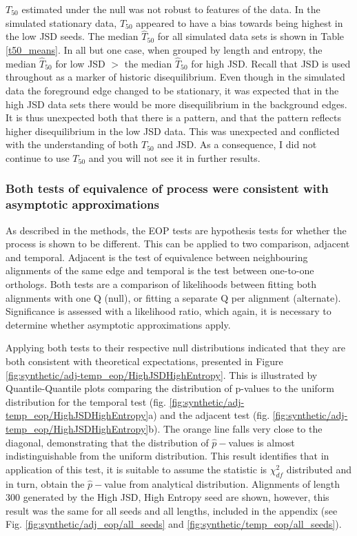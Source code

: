 

$T_{50}$ estimated under the null was not robust to features of the data. In the simulated stationary data, $T_{50}$ appeared to have a bias towards being highest in the low JSD seeds. The median $\hat T_{50}$ for all simulated data sets is shown in Table \ref{t50_means}. In all but one case, when grouped by length and entropy, the median $\hat T_{50}$ for low JSD $>$ the median $\hat T_{50}$ for high JSD. Recall that JSD is used throughout as a marker of historic disequilibrium. Even though in the simulated data the foreground edge changed to be stationary, it was expected that in the high JSD data sets there would be more disequilibrium in the background edges. It is thus unexpected both that there is a pattern, and that the pattern reflects higher disequilibrium in the low JSD data. This was unexpected and conflicted with the understanding of both $T_{50}$ and JSD.  As a consequence, I did not continue to use $T_{50}$ and you will not see it in further results.



\subsubsection*{Both tests of equivalence of process were consistent with asymptotic approximations}

 As described in the methods, the EOP tests are hypothesis tests for whether the process is shown to be different. This can be applied to two comparison, adjacent and temporal. Adjacent is the test of equivalence between neighbouring alignments of the same edge and temporal is the test between one-to-one orthologs. Both tests are a comparison of likelihoods between fitting both alignments with one $\mathrm{Q}$ (null), or fitting a separate $\mathrm{Q}$ per alignment (alternate). Significance is assessed with a likelihood ratio, which again, it is necessary to determine whether asymptotic approximations apply. 

Applying both tests to their respective null distributions indicated that they are both consistent with theoretical expectations, presented in Figure \ref{fig:synthetic/adj-temp_eop/HighJSDHighEntropy}. This is illustrated by Quantile-Quantile plots comparing the distribution of p-values to the uniform distribution for the temporal test (fig. \ref{fig:synthetic/adj-temp_eop/HighJSDHighEntropy}a) and the adjacent test (fig. \ref{fig:synthetic/adj-temp_eop/HighJSDHighEntropy}b). The orange line falls very close to the diagonal, demonstrating that the distribution of $\hat p-$values is almost indistinguishable from the uniform distribution.  This result identifies that in application of this test, it is suitable to assume the statistic is $\chi^2_{df}$ distributed and in turn, obtain the $\hat p-$value from analytical distribution. Alignments of length 300 generated by the High JSD, High Entropy seed are shown, however, this result was the same for all seeds and all lengths, included in the appendix (see Fig. \ref{fig:synthetic/adj_eop/all_seeds} and \ref{fig:synthetic/temp_eop/all_seeds}).

